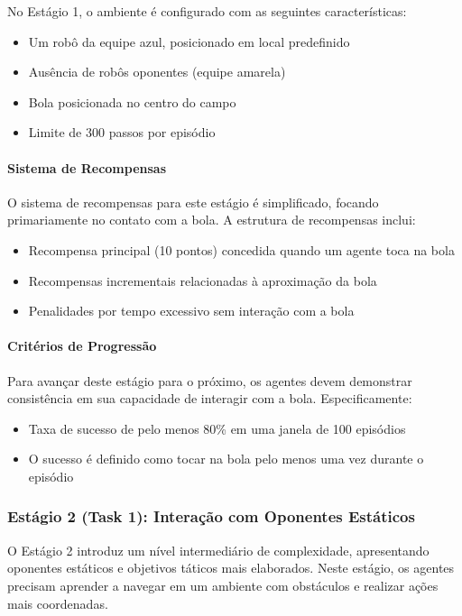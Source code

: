 No Estágio 1, o ambiente é configurado com as seguintes características:
\begin{itemize}
    \item Um robô da equipe azul, posicionado em local predefinido
    \item Ausência de robôs oponentes (equipe amarela)
    \item Bola posicionada no centro do campo
    \item Limite de 300 passos por episódio
\end{itemize}

\paragraph{Sistema de Recompensas}

O sistema de recompensas para este estágio é simplificado, focando primariamente no contato com a bola. A estrutura de recompensas inclui:
\begin{itemize}
    \item Recompensa principal (10 pontos) concedida quando um agente toca na bola
    \item Recompensas incrementais relacionadas à aproximação da bola
    \item Penalidades por tempo excessivo sem interação com a bola
\end{itemize}

\paragraph{Critérios de Progressão}

Para avançar deste estágio para o próximo, os agentes devem demonstrar consistência em sua capacidade de interagir com a bola. Especificamente:
\begin{itemize}
    \item Taxa de sucesso de pelo menos 80\% em uma janela de 100 episódios
    \item O sucesso é definido como tocar na bola pelo menos uma vez durante o episódio
\end{itemize}

\subsubsection{Estágio 2 (Task 1): Interação com Oponentes Estáticos}
\label{subsubsec:estagio2}

O Estágio 2 introduz um nível intermediário de complexidade, apresentando oponentes estáticos e objetivos táticos mais elaborados. Neste estágio, os agentes precisam aprender a navegar em um ambiente com obstáculos e realizar ações mais coordenadas.

